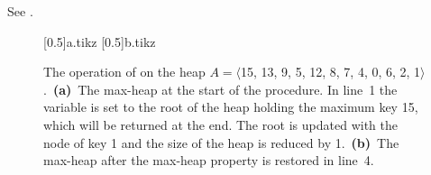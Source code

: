 See .
\begin{figure}[htb]
    \subcaptionbox{\label{fig:6.5-1a}}[0.5\textwidth]{{a.tikz}}
    \subcaptionbox{\label{fig:6.5-1b}}[0.5\textwidth]{{b.tikz}}
    \caption{The operation of  on the heap $A=\langle$15, 13, 9, 5, 12, 8, 7, 4, 0, 6, 2, 1$\rangle$.\,
    \textbf{(a)}\, The max-heap at the start of the procedure.
    In line~1 the variable  is set to the root of the heap holding the maximum key 15, which will be returned at the end.
    The root is updated with the node of key 1 and the size of the heap is reduced by 1.\,
    \textbf{(b)}\, The max-heap after the max-heap property is restored in line~4.} \label{fig:6.5-1}
\end{figure}
